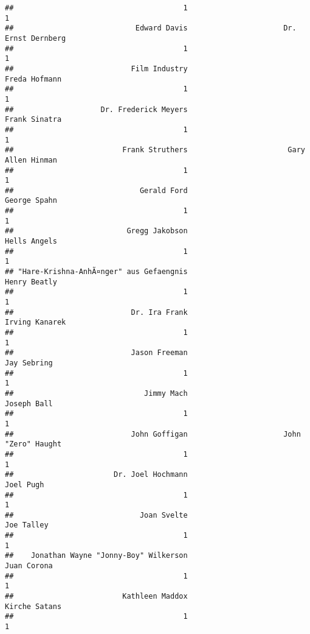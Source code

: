\documentclass[
]{article}
\begin{document}
\begin{verbatim}
##                                       1                                       1 
##                            Edward Davis                      Dr. Ernst Dernberg 
##                                       1                                       1 
##                           Film Industry                           Freda Hofmann 
##                                       1                                       1 
##                    Dr. Frederick Meyers                           Frank Sinatra 
##                                       1                                       1 
##                         Frank Struthers                       Gary Allen Hinman 
##                                       1                                       1 
##                             Gerald Ford                            George Spahn 
##                                       1                                       1 
##                          Gregg Jakobson                            Hells Angels 
##                                       1                                       1 
## "Hare-Krishna-AnhÃ¤nger" aus Gefaengnis                            Henry Beatly 
##                                       1                                       1 
##                           Dr. Ira Frank                          Irving Kanarek 
##                                       1                                       1 
##                           Jason Freeman                             Jay Sebring 
##                                       1                                       1 
##                              Jimmy Mach                             Joseph Ball 
##                                       1                                       1 
##                           John Goffigan                      John "Zero" Haught 
##                                       1                                       1 
##                       Dr. Joel Hochmann                               Joel Pugh 
##                                       1                                       1 
##                             Joan Svelte                              Joe Talley 
##                                       1                                       1 
##    Jonathan Wayne "Jonny-Boy" Wilkerson                             Juan Corona 
##                                       1                                       1 
##                         Kathleen Maddox                           Kirche Satans 
##                                       1                                       1 

\end{verbatim}
\end{document}
